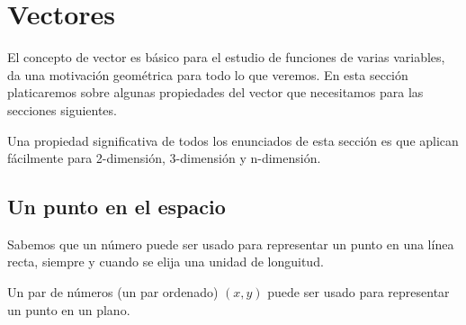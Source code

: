 \chapter{Vectores}\label{ch:vectores}

El concepto de vector es básico para el estudio de funciones de varias variables, da una motivación
geométrica para todo lo que veremos. En esta sección platicaremos sobre algunas propiedades del vector
que necesitamos para las secciones siguientes.

Una propiedad significativa de todos los enunciados de esta secci\'on es que aplican
f\'acilmente para 2-dimensión, 3-dimensión y n-dimensión.

\section{Un punto en el espacio}

Sabemos que un número puede ser usado para representar un punto en una línea recta, siempre y cuando se
elija una unidad de longuitud.

Un par de números (un par ordenado) $(x,y)$ puede ser usado para representar un punto en un plano.

\begin{figure}[!ht]%
    \centering
    \qquad
    \label{fig:example}%
\end{figure}

